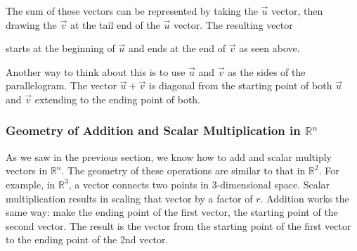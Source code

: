 \begin{center}
\end{center}
The sum of these vectors can be represented by taking the $\vec{u}$ vector, then drawing the $\vec{v}$ at the tail end of the $\vec{u}$ vector.  The resulting vector
\begin{center}
\end{center}
starts at the beginning of $\vec{u}$ and ends at the end of $\vec{v}$ as seen above.

Another way to think about this is to use $\vec{u}$ and $\vec{v}$ as the sides of the parallelogram.  The vector $\vec{u}+\vec{v}$ is diagonal from the starting point of both $\vec{u}$ and $\vec{v}$ extending to the ending point of both.
\begin{center}
\end{center}

\subsubsection{Geometry of Addition and Scalar Multiplication in $\mathbb{R}^n$}

As we saw in the previous section, we know how to add and scalar multiply vectors in $\mathbb{R}^n$.  The geometry of these operations are similar to that in $\mathbb{R}^2$.  For example, in $\mathbb{R}^3$, a vector connects two points in 3-dimensional space.  Scalar multiplication results in scaling that vector by a factor of $r$.  Addition works the same way: make the ending point of the first vector, the starting point of the second vector.  The result is the vector from the starting point of the first vector to the ending point of the 2nd vector.

